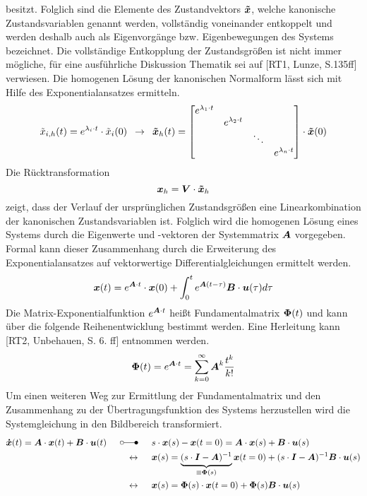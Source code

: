 besitzt. Folglich sind die Elemente des Zustandvektors $\boldsymbol{\tilde{x}}$, welche kanonische Zustandsvariablen genannt werden, vollständig voneinander entkoppelt und werden deshalb auch als Eigenvorgänge bzw. Eigenbewegungen des Systems bezeichnet. Die vollständige Entkopplung der Zustandsgrößen ist nicht immer mögliche, für eine ausführliche Diskussion Thematik sei auf [RT1, Lunze, S.135ff] verwiesen.
Die homogenen Lösung der kanonischen Normalform lässt sich mit Hilfe des Exponentialansatzes ermitteln.
\begin{equation}
\tilde{x}_{i,h}(t) = e^{\lambda_i\cdot t}\cdot \tilde{x}_i(0) \hspace{5pt}\rightarrow\hspace{5pt} \boldsymbol{\tilde{x}}_h(t) = \begin{bmatrix}
e^{\lambda_1\cdot t} &  & \\
& e^{\lambda_2\cdot t}  & \\
&  & \ddots & \\
&  & & e^{\lambda_n\cdot t}
\end{bmatrix}\cdot \boldsymbol{\tilde{x}}(0)
\end{equation}
Die Rücktransformation
\begin{equation}
\boldsymbol{x}_h = \boldsymbol{V}\cdot \boldsymbol{\tilde{x}}_h
\end{equation}
zeigt, dass der Verlauf der ursprünglichen Zustandsgrößen eine Linearkombination der kanonischen Zustandsvariablen ist. Folglich wird die homogenen Lösung eines Systems durch die Eigenwerte und -vektoren der Systemmatrix $\boldsymbol{A}$ vorgegeben. 
Formal kann dieser Zusammenhang durch die Erweiterung des Exponentialansatzes auf vektorwertige Differentialgleichungen ermittelt werden.
\begin{equation}
\boldsymbol{x}(t) = e^{\boldsymbol{A}\cdot t}\cdot \boldsymbol{x}(0) + \int^t_0 e^{\boldsymbol{A}(t-\tau)}\boldsymbol{B}\cdot \boldsymbol{u}(\tau)d\tau
\label{eq_fMat_zeitbereich}
\end{equation}
Die Matrix-Exponentialfunktion $e^{\boldsymbol{A}\cdot t}$ heißt Fundamentalmatrix $\boldsymbol{\Phi}(t)$ und kann über die folgende Reihenentwicklung bestimmt werden. Eine Herleitung kann [RT2, Unbehauen, S. 6. ff] entnommen werden. 
\begin{equation}
\boldsymbol{\Phi}(t) = e^{\boldsymbol{A}\cdot t} = \sum^{\infty}_{k=0} \boldsymbol{A}^k\frac{t^k}{k!}
\end{equation}
Um einen weiteren Weg zur Ermittlung der Fundamentalmatrix und den Zusammenhang zu der Übertragungsfunktion des Systems herzustellen wird die Systemgleichung in den Bildbereich transformiert.
\begin{equation}
\begin{split}
\bs{\dot{x}}(t) = \bs{A}\cdot \bs{x}(t) + \bs{B}\cdot\bs{u}(t) \myLaplace &s\cdot\bs{x}(s) - \bs{x}(t=0) = \bs{A}\cdot \bs{x}(s) + \bs{B}\cdot \bs{u}(s)
\\
\leftrightarrow \hspace{15pt} &\bs{x}(s) = \underbrace{(s\cdot \bs{I} - \bs{A})^{-1}}_{\equiv \bs{\Phi}(s)}\bs{x}(t=0) + (s\cdot \bs{I}-\bs{A})^{-1}\bs{B}\cdot \bs{u}(s) 
\\
\leftrightarrow \hspace{15pt}&\bs{x}(s) = \bs{\Phi}(s)\cdot \bs{x}(t=0) +\bs{\Phi}(s)\bs{B}\cdot \bs{u}(s)
\end{split}
\label{eq_fMat_bildbereich}
\end{equation}
